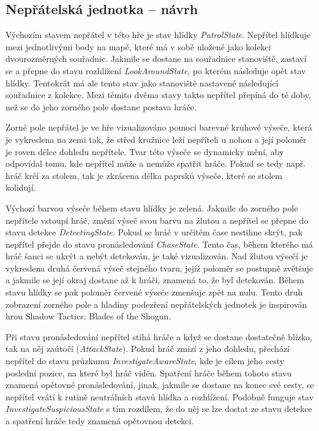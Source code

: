 \documentclass[FM,Proj]{tulthesis}
\begin{document}
	\subsection{Nepřátelská jednotka – návrh}
	
	Výchozím stavem nepřátel v této hře je stav hlídky \textit{PatrolState}. Nepřítel hlídkuje mezi jednotlivými body na mapě, které má v sobě uložené jako kolekci dvourozměrných souřadnic. Jakmile se dostane na souřadnice stanoviště, zastaví se a přepne do stavu rozhlížení \textit{LookAroundState}, po kterém následuje opět stav hlídky. Tentokrát má ale tento stav jako stanoviště nastavené následující souřadnice z kolekce. Mezi těmito dvěma stavy takto nepřítel přepíná do té doby, než se do jeho zorného pole dostane postava hráče.
	
	Zorné pole nepřátel je ve hře vizualizováno pomocí barevné kruhové výseče, která je vykreslena na zemi tak, že střed kružnice leží nepříteli u nohou a její poloměr je roven délce dohledu nepřítele. Tvar této výseče se dynamicky mění, aby odpovídal tomu, kde nepřítel může a nemůže spatřit hráče. Pokud se tedy např. hráč krčí za stolem, tak je zkrácena délka paprsků výseče, které se stolem kolidují.
	
	Výchozí barvou výseče během stavu hlídky je zelená. Jakmile do zorného pole nepřítele vstoupí hráč, změní výseč svou barvu na žlutou a nepřítel se přepne do stavu detekce \textit{DetectingState}. Pokud se hráč v určitém čase nestihne skrýt, pak nepřítel přejde do stavu pronásledování \textit{ChaseState}. Tento čas, během kterého má hráč šanci se ukrýt a nebýt detekován, je také vizualizován. Nad žlutou výsečí je vykreslena druhá červená výseč stejného tvaru, jejíž poloměr se postupně zvětšuje a jakmile se její okraj dostane až k hráči, znamená to, že byl detekován. Během stavu hlídky se pak poloměr červené výseče zmenšuje zpět na nulu. Tento druh zobrazení zorného pole a hladiny podezření nepřátelských jednotek je inspirován hrou Shadow Tactics: Blades of the Shogun.
	
	Při stavu pronásledování nepřítel stíhá hráče a když se dostane dostatečně blízko, tak na něj zaútočí (\textit{AttackState}). Pokud hráč zmizí z jeho dohledu, přechází nepřítel do stavu průzkumu \textit{InvestigateAwareState}, kde je cílem jeho cesty poslední pozice, na které byl hráč viděn. Spatření hráče během tohoto stavu znamená opětovné pronásledování, jinak, jakmile se dostane na konec své cesty, se nepřítel vrátí k rutině neutrálních stavů hlídka a rozhlížení. Podobně funguje stav \textit{InvestigateSuspiciousState} s tím rozdílem, že do něj se lze dostat ze stavu detekce a spatření hráče tedy znamená opětovnou detekci.
	
\end{document}
